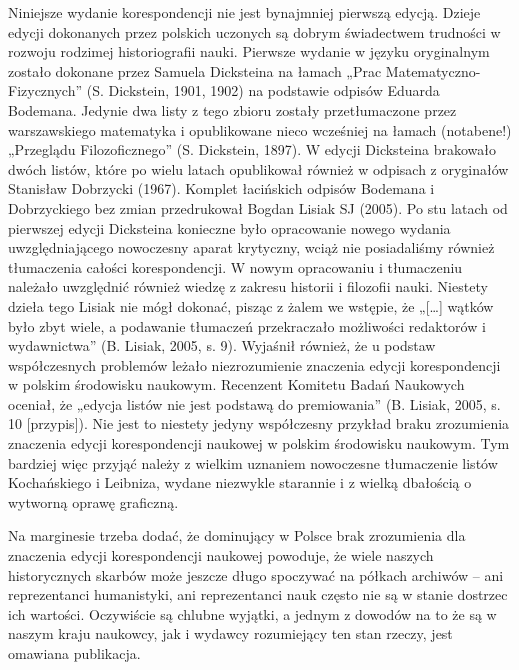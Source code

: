 \documentclass[a4paper]{article}
\begin{document}
Niniejsze wydanie korespondencji nie jest bynajmniej pierwszą edycją. Dzieje edycji dokonanych przez polskich uczonych
są dobrym świadectwem trudności w rozwoju rodzimej historiografii nauki. Pierwsze wydanie w języku oryginalnym zostało
dokonane przez Samuela Dicksteina na łamach „Prac Matematyczno-Fizycznych” \label{ref:RNDQZ5P2qjRIF}(S. Dickstein,
1901, 1902) na podstawie odpisów Eduarda Bodemana. Jedynie dwa listy z tego zbioru zostały przetłumaczone przez
warszawskiego matematyka i opublikowane nieco wcześniej na łamach (notabene!) „Przeglądu Filozoficznego”
\label{ref:RNDPWVI1402FW}(S. Dickstein, 1897). W edycji Dicksteina brakowało dwóch listów, które po wielu latach
opublikował również w odpisach z oryginałów Stanisław Dobrzycki \label{ref:RNDZro5CQEWai}(1967). Komplet łacińskich
odpisów Bodemana i Dobrzyckiego bez zmian przedrukował Bogdan Lisiak SJ \label{ref:RNDH2bcoL4kp0}(2005). Po stu latach
od pierwszej edycji Dicksteina konieczne było opracowanie nowego wydania uwzględniającego nowoczesny aparat krytyczny,
wciąż nie posiadaliśmy również tłumaczenia całości korespondencji. W nowym opracowaniu i tłumaczeniu należało
uwzględnić również wiedzę z zakresu historii i filozofii nauki. Niestety dzieła tego Lisiak nie mógł dokonać, pisząc z
żalem we wstępie, że „[…] wątków było zbyt wiele, a podawanie tłumaczeń przekraczało możliwości redaktorów i
wydawnictwa” \label{ref:RNDCfWVJWMSCO}(B. Lisiak, 2005, s. 9). Wyjaśnił również, że u podstaw współczesnych problemów
leżało niezrozumienie znaczenia edycji korespondencji w polskim środowisku naukowym. Recenzent Komitetu Badań Naukowych
oceniał, że „edycja listów nie jest podstawą do premiowania” \label{ref:RNDWLWa7Ayb7H}(B. Lisiak, 2005, s. 10
[przypis]). Nie jest to niestety jedyny współczesny przykład braku zrozumienia znaczenia edycji korespondencji naukowej
w polskim środowisku naukowym. Tym bardziej więc przyjąć należy z wielkim uznaniem nowoczesne tłumaczenie listów
Kochańskiego i Leibniza, wydane niezwykle starannie i z wielką dbałością o wytworną oprawę graficzną.

Na marginesie trzeba dodać, że dominujący w Polsce brak zrozumienia dla znaczenia edycji korespondencji naukowej
powoduje, że wiele naszych historycznych skarbów może jeszcze długo spoczywać na półkach archiwów – ani reprezentanci
humanistyki, ani reprezentanci nauk często nie są w stanie dostrzec ich wartości. Oczywiście są chlubne wyjątki, a
jednym z dowodów na to że są w naszym kraju naukowcy, jak i wydawcy rozumiejący ten stan rzeczy, jest omawiana
publikacja.
\end{document}
